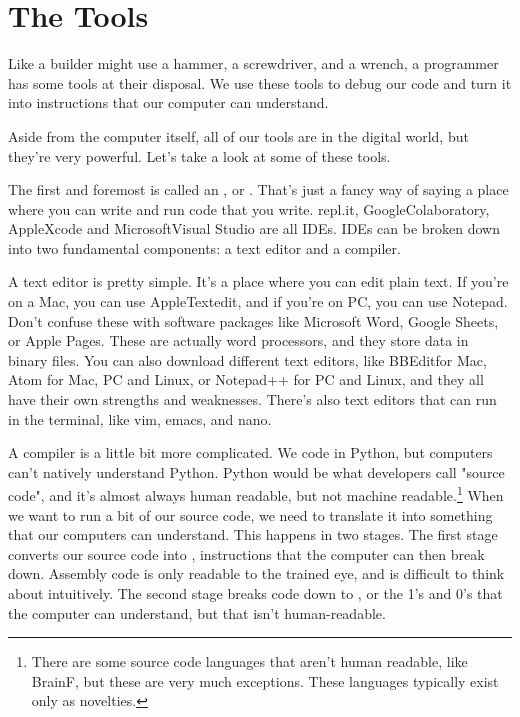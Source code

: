 \section{The Tools}
Like a builder might use a hammer, a screwdriver, and a wrench, a programmer has some tools at their disposal. We use these tools to debug our code and turn it into instructions that our computer can understand.\par
Aside from the computer itself, all of our tools are in the digital world, but they're very powerful. Let's take a look at some of these tools.\par
The first and foremost is called an , or . That's just a fancy way of saying a place where you can write and run code that you write. repl.it, Google\textregistered Colaboratory, Apple\textregistered Xcode and Microsoft\textregistered Visual Studio are all IDEs. IDEs can be broken down into two fundamental components: a text editor and a compiler.\par
A text editor is pretty simple. It's a place where you can edit plain text. If you're on a Mac, you can use Apple\textregistered Textedit, and if you're on PC, you can use Notepad. Don’t confuse these with software packages like Microsoft Word, Google Sheets, or Apple Pages. These are actually word processors, and they store data in binary files. You can also download different text editors, like BBEdit\textregistered for Mac, Atom for Mac, PC and Linux, or Notepad++ for PC and Linux, and they all have their own strengths and weaknesses. There's also text editors that can run in the terminal, like vim, emacs, and nano.\par
A compiler is a little bit more complicated. We code in Python, but computers can't natively understand Python. Python would be what developers call "source code", and it's almost always human readable, but not machine readable.\footnote{There are some source code languages that aren't human readable, like BrainF, but these are very much exceptions. These languages typically exist only as novelties.} When we want to run a bit of our source code, we need to translate it into something that our computers can understand. This happens in two stages. The first stage converts our source code into , instructions that the computer can then break down. Assembly code is only readable to the trained eye, and is difficult to think about intuitively. The second stage breaks code down to , or the 1's and 0's that the computer can understand, but that isn't human-readable.\par
